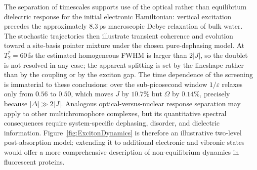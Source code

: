 \documentclass[journal=jpcbfk, manuscript=article, layout=twocolumn, doi=true]{achemso}
\begin{document}
The separation of timescales supports use of the optical rather than equilibrium dielectric response for the initial electronic Hamiltonian: vertical excitation precedes the approximately $8.3$\,ps macroscopic Debye relaxation of bulk water. The stochastic trajectories then illustrate transient coherence and evolution toward a site-basis pointer mixture under the chosen pure-dephasing model. At $T_2^*=60$\,fs the estimated homogeneous FWHM is larger than $2|J|$, so the doublet is not resolved in any case; the apparent splitting is set by the lineshape rather than by the coupling or by the exciton gap. The time dependence of the screening is immaterial to these conclusions: over the sub-picosecond window $1/\varepsilon$ relaxes only from $0.56$ to $0.50$, which moves $J$ by $10.7\%$ but $\Omega$ by $0.14\%$, precisely because $|\Delta|\gg2|J|$. Analogous optical-versus-nuclear response separation may apply to other multichromophore complexes, but its quantitative spectral consequences require system-specific dephasing, disorder, and dielectric information. Figure~\ref{fig:ExcitonDynamics} is therefore an illustrative two-level post-absorption model; extending it to additional electronic and vibronic states would offer a more comprehensive description of non-equilibrium dynamics in fluorescent proteins.
\end{document}
